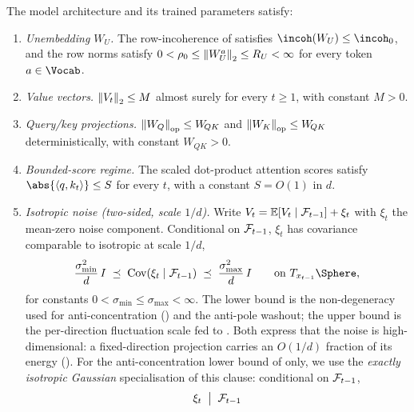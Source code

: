 \begin{assumption}
\label{ass:bounded_architecture}
The model architecture and its trained parameters satisfy:
\begin{enumerate}[label=(\arabic*),leftmargin=2em,itemsep=0.2em]
\item \emph{Unembedding $W_U$.} The row-incoherence of
        satisfies $\incoh(W_U)\le\incoh_0$, and the
       row norms satisfy $0<\rho_0\le\left\| W_U^a \right\|_2\le R_U<\infty$ for
       every token $a\in\Vocab$.
\item \emph{Value vectors.} $\left\| V_t \right\|_2\le M$ almost surely for every
       $t\ge1$, with constant $M>0$.
\item \emph{Query/key projections.}
       $\left\| W_Q \right\|_{\mathrm{op}}\le W_{\!QK}$ and
       $\left\| W_K \right\|_{\mathrm{op}}\le W_{\!QK}$ deterministically, with
       constant $W_{\!QK}>0$.
\item \emph{Bounded-score regime.} The scaled dot-product attention
       scores satisfy $\abs{\inner{q}{k_t}}\le S$ for every $t$, with a
       constant $S=O(1)$ in $d$.
\item \emph{Isotropic noise (two-sided, scale $1/d$).} Write
       $V_t=\mathbb{E}[V_t\mid\mathcal{F}_{t-1}]+\xi_t$ with $\xi_t$ the mean-zero noise
       component. Conditional on $\mathcal{F}_{t-1}$, $\xi_t$ has covariance
       comparable to isotropic at scale $1/d$,
       \begin{align}\label{eq:noise_isotropy}
          \frac{\sigma_{\min}^2}{d}\,I
          \;\preceq\;
          \operatorname{Cov}(\xi_t\mid\Fcal_{t-1})
          \;\preceq\;
          \frac{\sigma_{\max}^2}{d}\,I
          \qquad\text{on } T_{x_{t-1}}\Sphere,
       \end{align}
       for constants $0<\sigma_{\min}\le\sigma_{\max}<\infty$. The lower
       bound is the non-degeneracy used for anti-concentration
       () and the anti-pole washout; the
       upper bound is the per-direction fluctuation scale fed to
       . Both express that the noise is high-dimensional:
       a fixed-direction projection carries an $O(1/d)$ fraction of its
       energy (). For the anti-concentration lower
       bound of  only, we use the
       \emph{exactly isotropic Gaussian} specialisation of this clause:
       conditional on $\mathcal{F}_{t-1}$,
       \begin{align}\label{eq:noise_gaussian}
          \xi_t \;\bigm|\; \Fcal_{t-1}

\end{align}
\end{enumerate}
\end{assumption}

